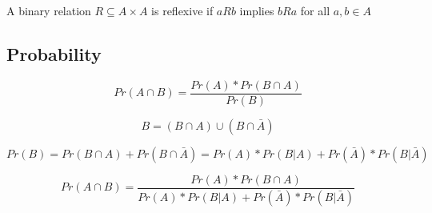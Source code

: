 \documentclass{article}
\begin{document}
A binary relation $R \subseteq A \times A$ is reflexive if
$a R b$ implies $b R a$ for all $a,b \in A$
\subsection{Probability}
$$
Pr(A\cap B)=\frac{Pr(A)*Pr(B \cap A)}{Pr(B)}
$$

$$
B=(B \cap A)\cup (B \cap \bar{A})
$$

$$
Pr(B)=Pr(B \cap A)+Pr(B \cap \bar{A})
=Pr(A)*Pr(B|A)+Pr(\bar{A})*Pr(B|\bar{A})
$$

$$
Pr(A\cap B)=\frac{Pr(A)*Pr(B \cap A)}{Pr(A)*Pr(B|A)+Pr(\bar{A})*Pr(B|\bar{A})}
$$
\end{document}
